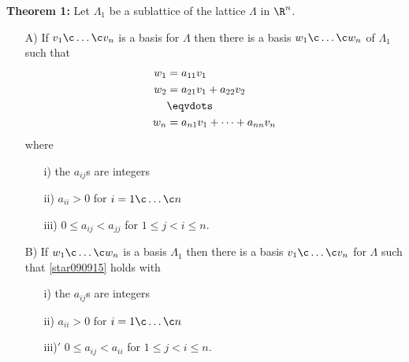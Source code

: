 \textbf{Theorem 1:} Let $\Lambda_1$ be a sublattice of the lattice $\Lambda$ in $\R^n$.
\begin{enumerate}
\item[A)] If $v_1\c \dotsc\c v_n$ is a basis for $\Lambda$ then there is a basis $w_1\c \dotsc\c w_n$ of $\Lambda_1$ such that
\begin{equation}
\begin{aligned}
w_1 &= a_{11}v_1 \\
w_2 &= a_{21}v_1 + a_{22}v_2 \\
&\eqvdots \\
w_n &= a_{n1}v_1 + \dotsb + a_{nn}v_n
\end{aligned}
\label{star090915}
\end{equation}
where
\begin{enumerate}
\item[i)] the $a_{ij}$s are integers
\item[ii)] $a_{ii}>0$ for $i=1\c \dotsc\c n$
\item[iii)] $0\leq a_{ij} < a_{jj}$ for $1\leq j < i \leq n$.
\end{enumerate}
\item[B)] If $w_1\c \dotsc\c w_n$ is a basis $\Lambda_1$ then there is a basis $v_1\c \dotsc\c v_n$ for $\Lambda$ such that \eqref{star090915} holds with
\begin{enumerate}
\item[i)] the $a_{ij}$s are integers
\item[ii)] $a_{ii}>0$ for $i=1\c \dotsc\c n$
\item[iii)$'$] $0\leq a_{ij} < a_{ii}$ for $1\leq j < i \leq n$.
\end{enumerate}
\end{enumerate}

